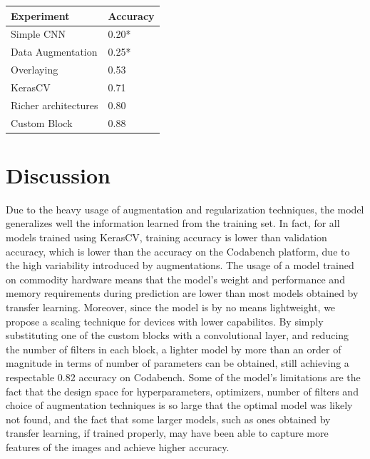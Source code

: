 \documentclass[11pt]{article}
\begin{document}
\begin{multicols}{2}
      \begin{table}[H]
          \centering
          \setlength{\tabcolsep}{3pt}
          \begin{tabularx}{\linewidth}{lY}
              \toprule
              Experiment & Accuracy \\
              \midrule
              Simple CNN & 0.20* \\
              Data Augmentation & 0.25* \\
              Overlaying & 0.53 \\
              KerasCV & 0.71 \\
              Richer architectures & 0.80 \\
              Custom Block & 0.88 \\
              \bottomrule
          \end{tabularx}
          \label{tab:results}
      \end{table}

      \section{Discussion}

      Due to the heavy usage of augmentation and regularization techniques, the model generalizes well the information learned from the training set. In fact, for all models trained using KerasCV, training accuracy is lower than validation accuracy, which is lower than the accuracy on the Codabench platform, due to the high variability introduced by augmentations. The usage of a model trained on commodity hardware means that the model's weight and performance and memory requirements during prediction are lower than most models obtained by transfer learning. Moreover, since the model is by no means lightweight, we propose a scaling technique for devices with lower capabilites. By simply substituting one of the custom blocks with a convolutional layer, and reducing the number of filters in each block, a lighter model by more than an order of magnitude in terms of number of parameters can be obtained, still achieving a respectable 0.82 accuracy on Codabench. Some of the model's limitations are the fact that the design space for hyperparameters, optimizers, number of filters and choice of augmentation techniques is so large that the optimal model was likely not found, and the fact that some larger models, such as ones obtained by transfer learning, if trained properly, may have been able to capture more features of the images and achieve higher accuracy.


\end{multicols}
\end{document}
